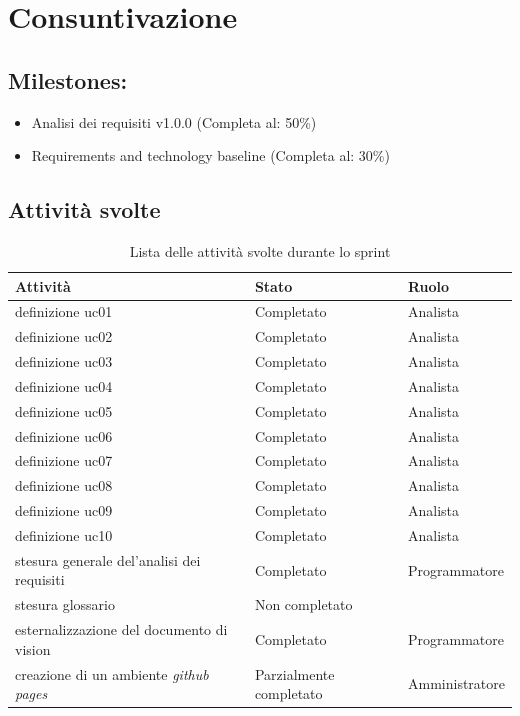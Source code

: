 \section{Consuntivazione}

\subsection{Milestones:}
\begin{itemize}
    \item Analisi dei requisiti v1.0.0 (Completa al: 50\%)
    \item Requirements and technology baseline (Completa al: 30\%)
\end{itemize}

\subsection{Attività svolte}


\begin{table}
    \begin{tabularx}{\textwidth}{X l l}
        
        \rowcolor{gray!30} \textbf{Attività} & \textbf{Stato} & \textbf{Ruolo}\\
        
        \hline

        definizione uc01 & Completato & Analista\\
        \rowcolor{gray!10}definizione uc02 & Completato & Analista\\
        definizione uc03   & Completato & Analista\\
        \rowcolor{gray!10}definizione uc04 & Completato & Analista\\
        definizione uc05 & Completato & Analista\\
        \rowcolor{gray!10}definizione uc06 & Completato & Analista\\
        definizione uc07 & Completato & Analista\\
        \rowcolor{gray!10}definizione uc08 & Completato & Analista\\
        definizione uc09   & Completato & Analista\\
        \rowcolor{gray!10}definizione uc10 & Completato & Analista\\
        stesura generale del'analisi dei requisiti & Completato & Programmatore\\
        \rowcolor{gray!10}stesura glossario & Non completato & \\
        esternalizzazione del documento di vision & Completato & Programmatore\\
        \rowcolor{gray!10}creazione di un ambiente \textit{github pages} & Parzialmente completato & Amministratore\\
    \end{tabularx}
    \caption{Lista delle attività svolte durante lo sprint}
\end{table}


